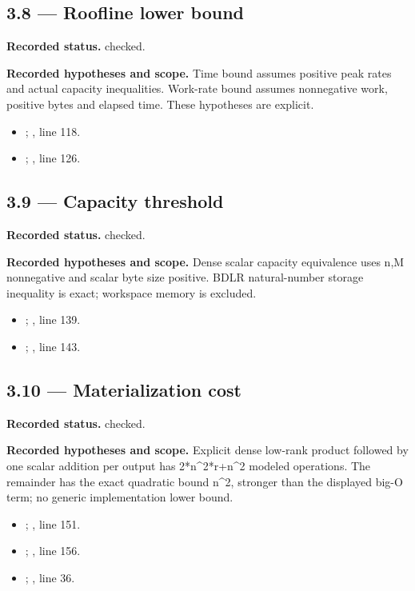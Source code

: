 \subsection{3.8 — Roofline lower bound}
\label{result:3.8}
\textbf{Recorded status.} checked.

\textbf{Recorded hypotheses and scope.} Time bound assumes positive peak rates and actual capacity inequalities. Work-rate bound assumes nonnegative work, positive bytes and elapsed time. These hypotheses are explicit.

\begin{itemize}
\item {}; , line 118.
\item {}; , line 126.
\end{itemize}
\subsection{3.9 — Capacity threshold}
\label{result:3.9}
\textbf{Recorded status.} checked.

\textbf{Recorded hypotheses and scope.} Dense scalar capacity equivalence uses n,M nonnegative and scalar byte size positive. BDLR natural-number storage inequality is exact; workspace memory is excluded.

\begin{itemize}
\item {}; , line 139.
\item {}; , line 143.
\end{itemize}
\subsection{3.10 — Materialization cost}
\label{result:3.10}
\textbf{Recorded status.} checked.

\textbf{Recorded hypotheses and scope.} Explicit dense low-rank product followed by one scalar addition per output has 2*n\textasciicircum{}2*r+n\textasciicircum{}2 modeled operations. The remainder has the exact quadratic bound n\textasciicircum{}2, stronger than the displayed big-O term; no generic implementation lower bound.

\begin{itemize}
\item {}; , line 151.
\item {}; , line 156.
\item {}; , line 36.
\end{itemize}
